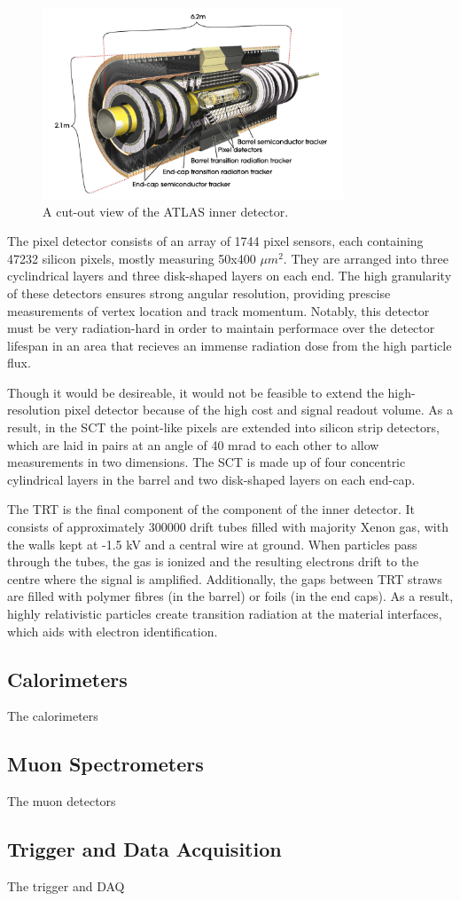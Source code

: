 \begin{figure}[H]
    \centering
    \includegraphics[width=0.8\textwidth]{Figures/2/InnerDetector.png}
    \caption{A cut-out view of the ATLAS inner detector.}
    \label{fig:atlasinner}
\end{figure}

The pixel detector consists of an array of 1744 pixel sensors, each containing 47232 silicon pixels, mostly measuring 50x400 $\mu m^2$. They are arranged into three cyclindrical layers and three disk-shaped layers on each end. The high granularity of these detectors ensures strong angular resolution, providing prescise measurements of vertex location and track momentum. Notably, this detector must be very radiation-hard in order to maintain performace over the detector lifespan in an area that recieves an immense radiation dose from the high particle flux.

Though it would be desireable, it would not be feasible to extend the high-resolution pixel detector because of the high cost and signal readout volume. As a result, in the SCT the point-like pixels are extended into silicon strip detectors, which are laid in pairs at an angle of 40 mrad to each other to allow measurements in two dimensions. The SCT is made up of four concentric cylindrical layers in the barrel and two disk-shaped layers on each end-cap.

The TRT is the final component of the component of the inner detector.  It consists of approximately 300000 drift tubes filled with majority Xenon gas, with the walls kept at -1.5 kV and a central wire at ground. When particles pass through the tubes, the gas is ionized and the resulting electrons drift to the centre where the signal is amplified. Additionally, the gaps between TRT straws are filled with polymer fibres (in the barrel) or foils (in the end caps). As a result, highly relativistic particles create transition radiation at the material interfaces, which aids with electron identification.


\subsection{Calorimeters}
The calorimeters
\subsection{Muon Spectrometers}
The muon detectors
\subsection{Trigger and Data Acquisition}
The trigger and DAQ
